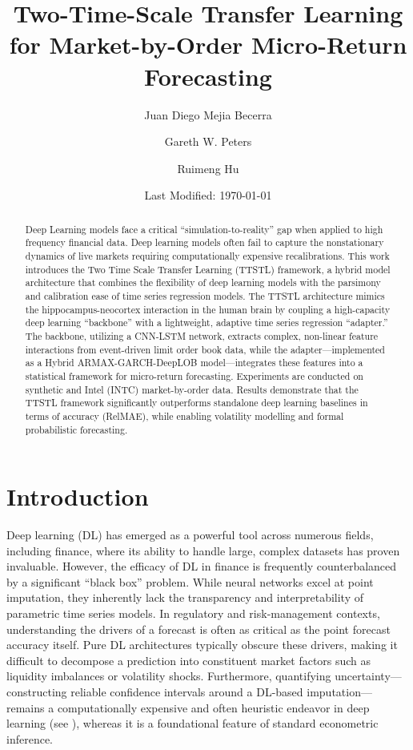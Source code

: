 \documentclass[10pt,a4paper,oneside]{article}
\title{Two-Time-Scale Transfer Learning for Market-by-Order Micro-Return Forecasting}
\author[1]{Juan Diego Mejia Becerra}
\author[1]{Gareth W. Peters}
\author[1,2]{Ruimeng Hu}
\affil[1]{Department of Statistics and Applied Probability, University of California, Santa Barbara}
\affil[2]{Department of Mathematics, University of California, Santa Barbara}
\date{Last Modified: \today}
\providecommand{\DIFaddbegin}{} %
\providecommand{\DIFaddend}{} %
\newcommand{\DIFaddincludegraphics}[2][]{{\color{blue}\fbox{\DIFOincludegraphics[#1]{#2}}}} %
\DeclareRobustCommand{\DIFaddbegin}{\DIFOaddbegin \let\includegraphics\DIFaddincludegraphics} %
\DeclareRobustCommand{\DIFaddend}{\DIFOaddend \let\includegraphics\DIFOincludegraphics} %
\begin{document}
\maketitle
\linenumbers

\begin{abstract}
    Deep Learning models face a critical ``simulation-to-reality'' gap when applied to high frequency financial data. Deep learning models often fail to capture the nonstationary dynamics of live markets requiring computationally expensive recalibrations. This work introduces the Two Time Scale Transfer Learning (TTSTL) framework, a hybrid model architecture that combines the flexibility of deep learning models with the parsimony and calibration ease of time series regression models. The TTSTL architecture mimics the hippocampus-neocortex interaction in the human brain by coupling a high-capacity deep learning ``backbone'' with a lightweight, adaptive time series regression ``adapter.'' The backbone, utilizing a CNN-LSTM network, extracts complex, non-linear feature interactions from event-driven limit order book data, while the adapter—implemented as a Hybrid ARMAX-GARCH-DeepLOB model—integrates these features into a statistical framework for micro-return forecasting. Experiments are conducted on synthetic and Intel (INTC) market-by-order data. Results demonstrate that the TTSTL framework significantly outperforms standalone deep learning baselines in terms of accuracy (RelMAE), while enabling volatility modelling and formal probabilistic forecasting.
\end{abstract}

\section{Introduction}
\label{Sect:Intro}
\DIFaddbegin 

\DIFaddend Deep learning (DL) has emerged as a powerful tool across numerous fields, including finance, where its ability to handle large, complex datasets has proven invaluable. However, the efficacy of DL in finance is frequently counterbalanced by a significant ``black box'' problem. While neural networks excel at point imputation, they inherently lack the transparency and interpretability of parametric time series models. In regulatory and risk-management contexts, understanding the drivers of a forecast is often as critical as the point forecast accuracy itself. Pure DL architectures typically obscure these drivers, making it difficult to decompose a prediction into constituent market factors such as liquidity imbalances or volatility shocks. Furthermore, quantifying uncertainty—constructing reliable confidence intervals around a DL-based imputation—remains a computationally expensive and often heuristic endeavor in deep learning (see \cite{barber2023conformalpredictionexchangeability}), whereas it is a foundational feature of standard econometric inference.
\end{document}
